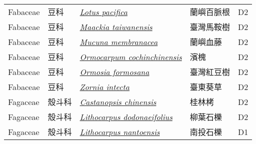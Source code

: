 {\begin{longtable}{L{2.5cm}L{2cm}L{5cm}L{2.5cm}L{3cm}}
    Fabaceae & 豆科 & \href{http://www.theplantlist.org/tpl1.1/search?q=Lotus+pacifica}{\textit{Lotus pacifica} } & 蘭嶼百脈根 & D2    \\
    Fabaceae & 豆科 & \href{http://www.theplantlist.org/tpl1.1/search?q=Maackia+taiwanensis}{\textit{Maackia taiwanensis} } & 臺灣馬鞍樹 & D2    \\
    Fabaceae & 豆科 & \href{http://www.theplantlist.org/tpl1.1/search?q=Mucuna+membranacea}{\textit{Mucuna membranacea} } & 蘭嶼血藤 & D2    \\
    Fabaceae & 豆科 & \href{http://www.theplantlist.org/tpl1.1/search?q=Ormocarpum+cochinchinensis}{\textit{Ormocarpum cochinchinensis} } & 濱槐 & D2    \\
    Fabaceae & 豆科 & \href{http://www.theplantlist.org/tpl1.1/search?q=Ormosia+formosana}{\textit{Ormosia formosana} } & 臺灣紅豆樹 & D2    \\
    Fabaceae & 豆科 & \href{http://www.theplantlist.org/tpl1.1/search?q=Zornia+intecta}{\textit{Zornia intecta} } & 臺東葵草 & D2    \\
    Fagaceae & 殼斗科 & \href{http://www.theplantlist.org/tpl1.1/search?q=Castanopsis+chinensis}{\textit{Castanopsis chinensis} } & 桂林栲 & D2    \\
    Fagaceae & 殼斗科 & \href{http://www.theplantlist.org/tpl1.1/search?q=Lithocarpus+dodonaeifolius}{\textit{Lithocarpus dodonaeifolius} } & 柳葉石櫟 & D2    \\
    Fagaceae & 殼斗科 & \href{http://www.theplantlist.org/tpl1.1/search?q=Lithocarpus+nantoensis}{\textit{Lithocarpus nantoensis} } & 南投石櫟 & D1    \\

\end{longtable}}
